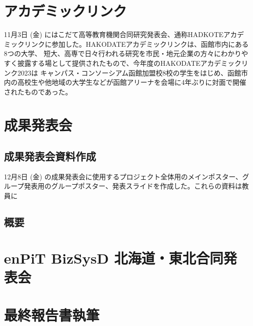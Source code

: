 \section{アカデミックリンク}
 11月3日 (金) にはこだて高等教育機関合同研究発表会、通称HADKOTEアカデミックリンクに参加した。HAKODATEアカデミックリンクは、函館市内にある8つの大学、
短大、高専で日々行われる研究を市民・地元企業の方々にわかりやすく披露する場として提供されたもので、今年度のHAKODATEアカデミックリンク2023は
キャンパス・コンソーシアム函館加盟校8校の学生をはじめ、函館市内の高校生や他地域の大学生などが函館アリーナを会場に4年ぶりに対面で開催されたものであった。

\section{成果発表会}
\subsection{成果発表会資料作成}
 12月8日 (金) の成果発表会に使用するプロジェクト全体用のメインポスター、グループ発表用のグループポスター、発表スライドを作成した。これらの資料は教員に
\subsection{概要}

\section{enPiT BizSysD 北海道・東北合同発表会}

\section{最終報告書執筆}
